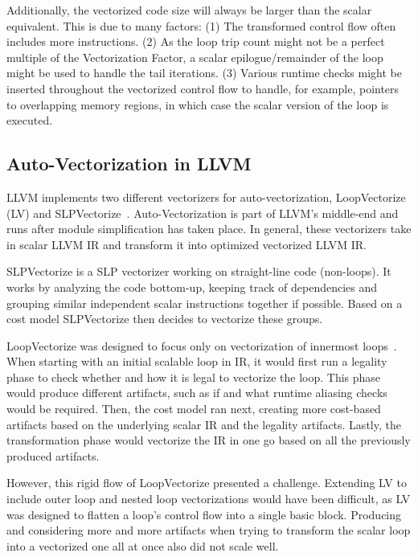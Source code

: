 \documentclass[sigplan,11pt,nonacm]{acmart}
\begin{document}
Additionally, the vectorized code size will always be larger than the scalar equivalent. This is
due to many factors: (1) The transformed control flow often includes more instructions.
(2) As the loop trip count might not be a perfect multiple of the Vectorization Factor, a scalar
epilogue/remainder of the loop might be used to handle the tail iterations. (3) Various runtime
checks might be inserted throughout the vectorized control flow to handle, for example, pointers 
to overlapping memory regions, in which case the scalar version of the loop is executed.

\subsection{Auto-Vectorization in LLVM}
LLVM implements two different vectorizers for auto-vectorization, LoopVectorize (LV)
and SLPVectorize~\cite{llvmvec,llvmhistorystate}. Auto-Vectorization is part of LLVM's 
middle-end and runs after module simplification has taken place.
In general, these vectorizers take in scalar LLVM IR and transform it into optimized vectorized 
LLVM IR.

SLPVectorize is a SLP vectorizer working on straight-line code (non-loops). It works by analyzing
the code bottom-up, keeping track of dependencies and grouping similar independent scalar instructions
together if possible. Based on a cost model SLPVectorize then decides to vectorize these groups.

LoopVectorize was designed to focus only on vectorization of innermost loops~\cite{llvmintrvplan}. 
When starting with an initial scalable loop in IR, it would first run a legality phase to check 
whether and how it is legal to vectorize the loop. This phase would produce different artifacts, 
such as if 
and what runtime aliasing checks would be required. Then, the cost model ran next, creating more 
cost-based artifacts based on the underlying scalar IR and the legality artifacts. 
Lastly, the transformation phase would vectorize 
the IR in one go based on all the previously produced artifacts.

However, this rigid flow of LoopVectorize presented a challenge. Extending LV to include outer loop 
and nested loop vectorizations would have been difficult, as LV was designed to flatten a
loop's control flow into a single basic block. Producing and considering more and 
more artifacts when trying to transform the scalar loop into a vectorized one all at once also did 
not scale well.
\end{document}
